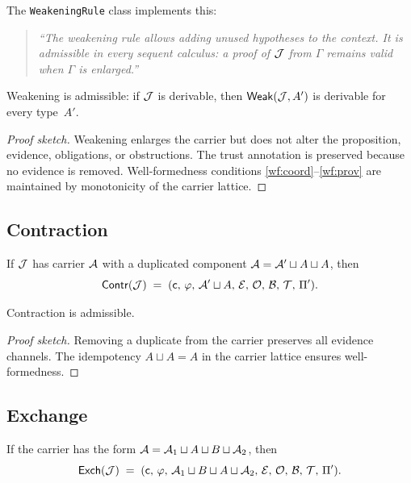 \documentclass[11pt]{article}
\begin{document}
The \texttt{WeakeningRule} class implements this:

\begin{quote}\itshape
``The weakening rule allows adding unused hypotheses to the context.
It is admissible in every sequent calculus: a proof of $\mathcal{J}$ from $\Gamma$
remains valid when $\Gamma$ is enlarged.''
\end{quote}

\begin{theorem}\label{thm:weak}
Weakening is admissible: if $\mathcal{J}$ is derivable, then $\mathsf{Weak}(\mathcal{J}, A')$
is derivable for every type~$A'$.
\end{theorem}

\begin{proof}[Proof sketch]
Weakening enlarges the carrier but does not alter the proposition, evidence,
obligations, or obstructions.  The trust annotation is preserved because no
evidence is removed.  Well-formedness conditions \ref{wf:coord}--\ref{wf:prov}
are maintained by monotonicity of the carrier lattice.
\end{proof}

\subsection{Contraction}

\begin{definition}[Contraction]
If $\mathcal{J}$ has carrier $\mathcal{A}$ with a duplicated component
$\mathcal{A} = \mathcal{A}' \sqcup A \sqcup A$, then
\[
  \mathsf{Contr}(\mathcal{J}) \;=\;
  (\mathsf{c},\,\varphi,\,\mathcal{A}' \sqcup A,\,\mathcal{E},\,\mathcal{O},\,\mathcal{B},\,\mathcal{T},\,\Pi').
\]
\end{definition}

\begin{theorem}\label{thm:contr}
Contraction is admissible.
\end{theorem}

\begin{proof}[Proof sketch]
Removing a duplicate from the carrier preserves all evidence channels.
The idempotency $A \sqcup A = A$ in the carrier lattice ensures
well-formedness.
\end{proof}

\subsection{Exchange}

\begin{definition}[Exchange]
If the carrier has the form $\mathcal{A} = \mathcal{A}_1 \sqcup A \sqcup B
\sqcup \mathcal{A}_2$, then
\[
  \mathsf{Exch}(\mathcal{J}) \;=\;
  (\mathsf{c},\,\varphi,\,\mathcal{A}_1 \sqcup B \sqcup A \sqcup \mathcal{A}_2,\,\mathcal{E},\,\mathcal{O},\,\mathcal{B},\,\mathcal{T},\,\Pi').
\]
\end{definition}
\end{document}
